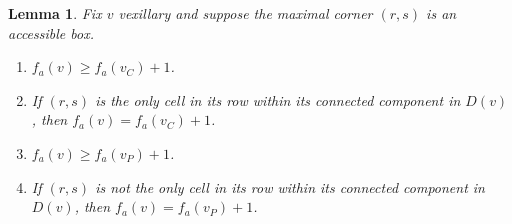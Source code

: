 \documentclass[12pt]{amsart}
\newtheorem{lemma}[theorem]{Lemma}
\theoremstyle{definition}
\theoremstyle{remark}
\numberwithin{equation}{section}
\newcommand{\antidiagstat}{f_a}
\begin{document}
\begin{lemma}
\label{lemma:accmaximal corner}
Fix $v$ vexillary and suppose the maximal corner $(r,s)$ is an accessible box.
\begin{enumerate}
\item  $\antidiagstat(v)\geq \antidiagstat(v_C)+1 $.
\item If $(r,s)$ is the only cell in its row within its connected component in $D(v)$, then $\antidiagstat(v)=\antidiagstat(v_C)+1$.
\item $\antidiagstat(v)\geq \antidiagstat(v_P)+1$.

\item If $(r,s)$ is not the only cell in its row within its connected component in $D(v)$, then $\antidiagstat(v)=\antidiagstat(v_P)+1$.
\end{enumerate}
\end{lemma}
\end{document}
